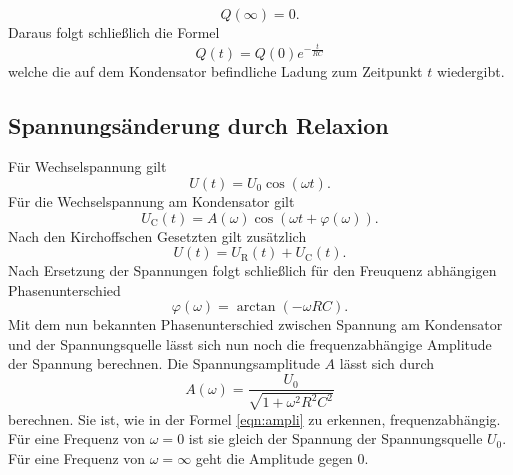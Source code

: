 \begin{equation*}
    Q(\infty) = 0.
\end{equation*}
Daraus folgt schließlich die Formel
\begin{equation}
    Q(t) = Q(0) e^{-\frac{t}{RC}}
    \label{eqn:ladungkondi}
\end{equation}
welche die auf dem Kondensator befindliche Ladung zum Zeitpunkt $t$ wiedergibt.

\subsection{Spannungsänderung durch Relaxion}
Für Wechselspannung gilt 
\begin{equation}
    U(t) = U_0 \cos(\omega t).
\end{equation}
Für die Wechselspannung am Kondensator gilt 
\begin{equation}
    U_\text{C}(t) = A(\omega) \cos(\omega t + \varphi(\omega)).
\end{equation}
Nach den Kirchoffschen Gesetzten gilt zusätzlich
\begin{equation}
    U(t) = U_\text{R}(t) + U_\text{C}(t).
\end{equation}
Nach Ersetzung der Spannungen folgt schließlich für den Freuquenz abhängigen Phasenunterschied
\begin{equation}
    \varphi(\omega) = \arctan(-\omega RC).
    \label{eqn:phase}
\end{equation}
Mit dem nun bekannten Phasenunterschied zwischen Spannung am Kondensator und der Spannungsquelle lässt sich nun noch die frequenzabhängige Amplitude der Spannung berechnen.
Die Spannungsamplitude $A$ lässt sich durch 
\begin{equation}
    A(\omega) = \frac{U_0}{\sqrt{1+\omega^2 R^2 C^2}}
    \label{eqn:ampli}
\end{equation}
berechnen.
Sie ist, wie in der Formel \ref{eqn:ampli} zu erkennen, frequenzabhängig.
Für eine Frequenz von $\omega = 0$ ist sie gleich der Spannung der Spannungsquelle $U_0$.
Für eine Frequenz von $\omega = \infty$ geht die Amplitude gegen 0.

